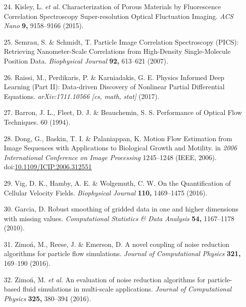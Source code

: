 \documentclass[12pt,a4paper,]{Dissertate}
\begin{document}
\leavevmode\hypertarget{ref-kisley_characterization_2015}{}%
24. Kisley, L. \emph{et al.} Characterization of Porous Materials by
Fluorescence Correlation Spectroscopy Super-resolution Optical
Fluctuation Imaging. \emph{ACS Nano} \textbf{9,} 9158--9166 (2015).

\leavevmode\hypertarget{ref-semrau_particle_2007}{}%
25. Semrau, S. \& Schmidt, T. Particle Image Correlation Spectroscopy
(PICS): Retrieving Nanometer-Scale Correlations from High-Density
Single-Molecule Position Data. \emph{Biophysical Journal} \textbf{92,}
613--621 (2007).

\leavevmode\hypertarget{ref-raissi_physics_2017}{}%
26. Raissi, M., Perdikaris, P. \& Karniadakis, G. E. Physics Informed
Deep Learning (Part II): Data-driven Discovery of Nonlinear Partial
Differential Equations. \emph{arXiv:1711.10566 {[}cs, math, stat{]}}
(2017).

\leavevmode\hypertarget{ref-barron_performance_1994}{}%
27. Barron, J. L., Fleet, D. J. \& Beauchemin, S. S. Performance of
Optical Flow Techniques. 60 (1994).

\leavevmode\hypertarget{ref-dong_motion_2006}{}%
28. Dong, G., Baskin, T. I. \& Palaniappan, K. Motion Flow Estimation
from Image Sequences with Applications to Biological Growth and
Motility. in \emph{2006 International Conference on Image Processing}
1245--1248 (IEEE, 2006).
doi:\href{https://doi.org/10.1109/ICIP.2006.312551}{10.1109/ICIP.2006.312551}

\leavevmode\hypertarget{ref-vig_quantification_2016}{}%
29. Vig, D. K., Hamby, A. E. \& Wolgemuth, C. W. On the Quantification
of Cellular Velocity Fields. \emph{Biophysical Journal} \textbf{110,}
1469--1475 (2016).

\leavevmode\hypertarget{ref-garcia_robust_2010}{}%
30. Garcia, D. Robust smoothing of gridded data in one and higher
dimensions with missing values. \emph{Computational Statistics \& Data
Analysis} \textbf{54,} 1167--1178 (2010).

\leavevmode\hypertarget{ref-zimon_novel_2016}{}%
31. Zimoń, M., Reese, J. \& Emerson, D. A novel coupling of noise
reduction algorithms for particle flow simulations. \emph{Journal of
Computational Physics} \textbf{321,} 169--190 (2016).

\leavevmode\hypertarget{ref-zimon_evaluation_2016}{}%
32. Zimoń, M. \emph{et al.} An evaluation of noise reduction algorithms
for particle-based fluid simulations in multi-scale applications.
\emph{Journal of Computational Physics} \textbf{325,} 380--394 (2016).
\end{document}
